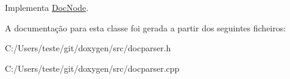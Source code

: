 Implementa \hyperlink{class_doc_node_a27e5d1dde6c9e861b52afa5a95f71d2d}{Doc\-Node}.



A documentação para esta classe foi gerada a partir dos seguintes ficheiros\-:\begin{DoxyCompactItemize}
\item 
C\-:/\-Users/teste/git/doxygen/src/docparser.\-h\item 
C\-:/\-Users/teste/git/doxygen/src/docparser.\-cpp\end{DoxyCompactItemize}
